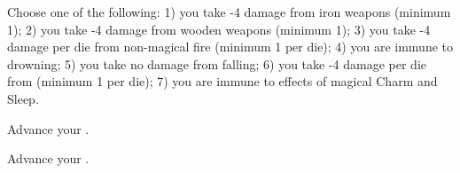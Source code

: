 \begin{multicols*}{2}



Choose one of the following: 1) you take -4 damage from iron weapons (minimum 1); 2) you take -4 damage from wooden weapons (minimum 1); 3) you take -4 damage per die from non-magical fire (minimum 1 per die); 4) you are immune to drowning; 5) you take no damage from falling; 6) you take -4 damage per die from  (minimum 1 per die); 7) you are immune to effects of magical Charm and Sleep.


\cbreak




Advance your  \DCUP.


Advance your  \DCUP. 

\end{multicols*}


